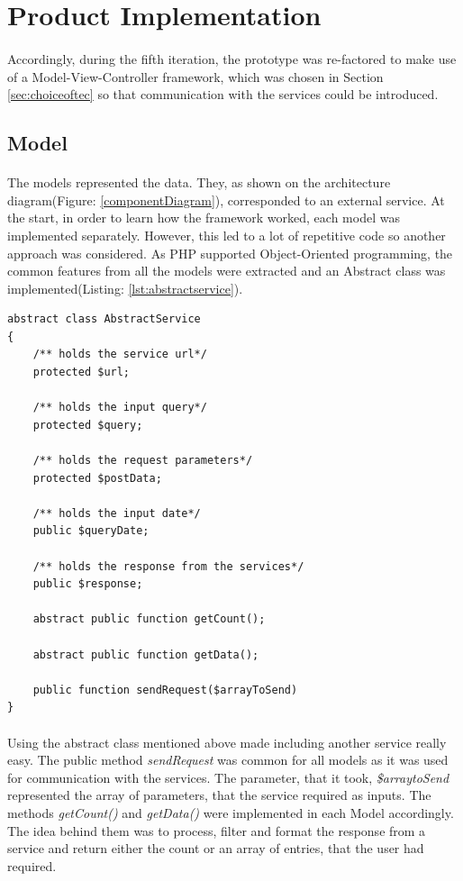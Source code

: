 \documentclass{l4proj}
\begin{document}
\section{Product Implementation}
\paragraph{}
Accordingly, during the fifth iteration, the prototype was re-factored to make use of a Model-View-Controller framework, which was chosen in Section \ref{sec:choiceoftec} so that communication with the services could be introduced.

\subsection{Model}
\label{sub:model}
\paragraph{}
The models represented the data. They, as shown on the architecture diagram(Figure: \ref{componentDiagram}), corresponded to an external service. At the start, in order to learn how the framework worked, each model was implemented separately. However, this led to a lot of repetitive code so another approach was considered. As PHP supported Object-Oriented programming, the common features from all the models were extracted and an Abstract class was implemented(Listing: \ref{lst:abstractservice}). 
\begin{lstlisting}[caption={Abstract Service class},label={lst:abstractservice}]
abstract class AbstractService
{
	/** holds the service url*/
	protected $url;
	
	/** holds the input query*/
	protected $query;
	
	/** holds the request parameters*/
	protected $postData;
	
	/** holds the input date*/
	public $queryDate;
	
	/** holds the response from the services*/
	public $response;
	
	abstract public function getCount();
	
	abstract public function getData();
	
	public function sendRequest($arrayToSend)  
}  
\end{lstlisting}
\paragraph{}
Using the abstract class mentioned above made including another service really easy. The public method \textit{sendRequest} was common for all models as it was used for communication with the services. The parameter, that it took, \textit{\$arraytoSend} represented the array of parameters, that the service required as inputs. The methods \textit{getCount()} and \textit{getData()} were implemented in each Model accordingly. The idea behind them was to process, filter and format the response from a service and return either the count or an array of entries, that the user had required.  
\end{document}
